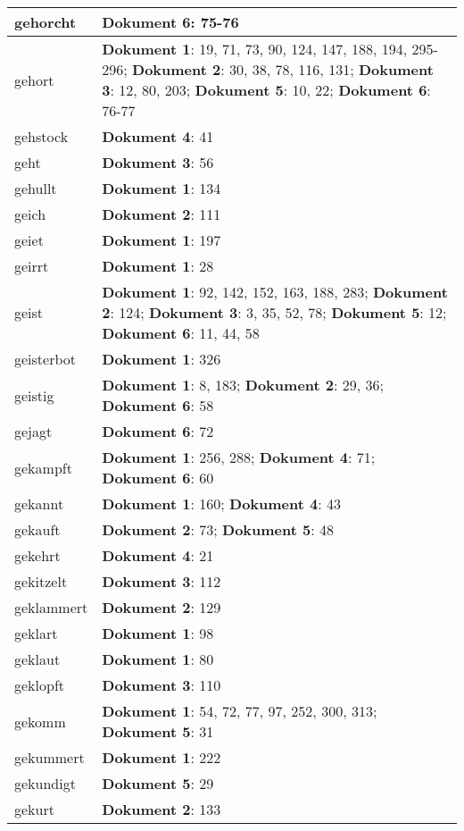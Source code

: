 \documentclass[a5paper]{article}
\begin{document}
\begin{longtable}[l]{|l|p{3in}|}
\hline
gehorcht & \textbf{Dokument 6}: 75-76 \\
\hline
gehort & \textbf{Dokument 1}: 19, 71, 73, 90, 124, 147, 188, 194, 295-296; \textbf{Dokument 2}: 30, 38, 78, 116, 131; \textbf{Dokument 3}: 12, 80, 203; \textbf{Dokument 5}: 10, 22; \textbf{Dokument 6}: 76-77 \\
\hline
gehstock & \textbf{Dokument 4}: 41 \\
\hline
geht & \textbf{Dokument 3}: 56 \\
\hline
gehullt & \textbf{Dokument 1}: 134 \\
\hline
geich & \textbf{Dokument 2}: 111 \\
\hline
geiet & \textbf{Dokument 1}: 197 \\
\hline
geirrt & \textbf{Dokument 1}: 28 \\
\hline
geist & \textbf{Dokument 1}: 92, 142, 152, 163, 188, 283; \textbf{Dokument 2}: 124; \textbf{Dokument 3}: 3, 35, 52, 78; \textbf{Dokument 5}: 12; \textbf{Dokument 6}: 11, 44, 58 \\
\hline
geisterbot & \textbf{Dokument 1}: 326 \\
\hline
geistig & \textbf{Dokument 1}: 8, 183; \textbf{Dokument 2}: 29, 36; \textbf{Dokument 6}: 58 \\
\hline
gejagt & \textbf{Dokument 6}: 72 \\
\hline
gekampft & \textbf{Dokument 1}: 256, 288; \textbf{Dokument 4}: 71; \textbf{Dokument 6}: 60 \\
\hline
gekannt & \textbf{Dokument 1}: 160; \textbf{Dokument 4}: 43 \\
\hline
gekauft & \textbf{Dokument 2}: 73; \textbf{Dokument 5}: 48 \\
\hline
gekehrt & \textbf{Dokument 4}: 21 \\
\hline
gekitzelt & \textbf{Dokument 3}: 112 \\
\hline
geklammert & \textbf{Dokument 2}: 129 \\
\hline
geklart & \textbf{Dokument 1}: 98 \\
\hline
geklaut & \textbf{Dokument 1}: 80 \\
\hline
geklopft & \textbf{Dokument 3}: 110 \\
\hline
gekomm & \textbf{Dokument 1}: 54, 72, 77, 97, 252, 300, 313; \textbf{Dokument 5}: 31 \\
\hline
gekummert & \textbf{Dokument 1}: 222 \\
\hline
gekundigt & \textbf{Dokument 5}: 29 \\
\hline
gekurt & \textbf{Dokument 2}: 133 \\

\end{longtable}
\end{document}

